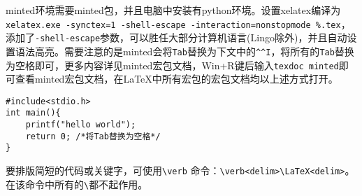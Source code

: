 minted环境需要minted包，并且电脑中安装有python环境。设置xelatex编译为\verb|xelatex.exe -synctex=1 -shell-escape -interaction=nonstopmode %.tex|，添加了\verb|-shell-escape|参数，可以胜任大部分计算机语言(Lingo除外)，并且自动设置语法高亮。需要注意的是minted会将\verb|Tab|替换为下文中的\verb|^^I|，将所有的\verb|Tab|替换为空格即可，更多内容详见minted宏包文档，Win+R键后输入\verb|texdoc minted|即可查看minted宏包文档，在\LaTeX 中所有宏包的宏包文档均以上述方式打开。
\begin{verbatim}
#include<stdio.h>
int main(){
	printf("hello world");
    return 0; /*将Tab替换为空格*/
}
\end{verbatim}

要排版简短的代码或关键字，可使用\verb|\verb| 命令：\verb|\verb<delim>\LaTeX<delim>|。
在该命令中所有的\verb|\|都不起作用。